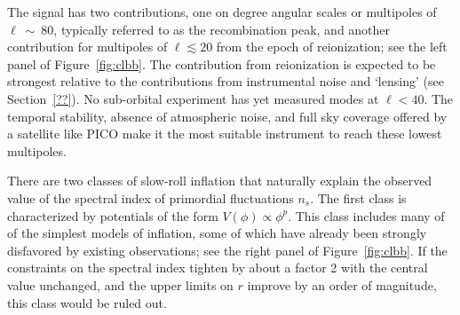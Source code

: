 \documentclass[PICOReport.tex]{subfiles}
\begin{document}
The signal has two contributions, one on degree angular scales or multipoles of $\ell~\sim~80$, 
typically referred to as the recombination peak, and another contribution for multipoles of $\ell\lesssim 20$ 
from the epoch of reionization; see the left panel of Figure~\ref{fig:clbb}. The contribution from reionization 
is expected 
to be strongest relative to the contributions from instrumental noise and `lensing' (see Section~\ref{??}).  
No sub-orbital experiment has yet measured modes at $\ell<40$. The temporal stability, absence of 
atmospheric noise, and full sky coverage offered by a satellite like PICO make it
the most suitable instrument to reach these lowest multipoles.  

There are two classes of slow-roll inflation that naturally explain the observed value of the 
spectral index of primordial fluctuations $n_s$. The first class is characterized by potentials of the 
form $V(\phi)\propto\phi^p$. This class includes many of of the simplest models of inflation, 
some of which have already been strongly disfavored by existing observations; see the right panel of 
Figure~\ref{fig:clbb}. If the constraints on the spectral index tighten by about a factor 2 with the 
central value unchanged, and the upper limits on $r$ improve by an order of magnitude, this class 
would be ruled out. 
\end{document}
